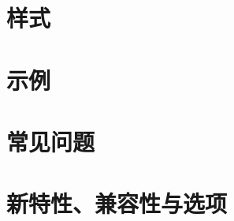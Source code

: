 \documentclass[DIV         = 14,
               fontsize    = 10,
               index       = totoc,
               twoside,
               cadre,
               headings    = small,
               ]{tkz-doc-euclide}
\begin{document}
\part{样式}


\part{示例}



\part{常见问题}


\part{新特性、兼容性与选项}



\clearpage\newpage
\small\printindex
\end{document}
